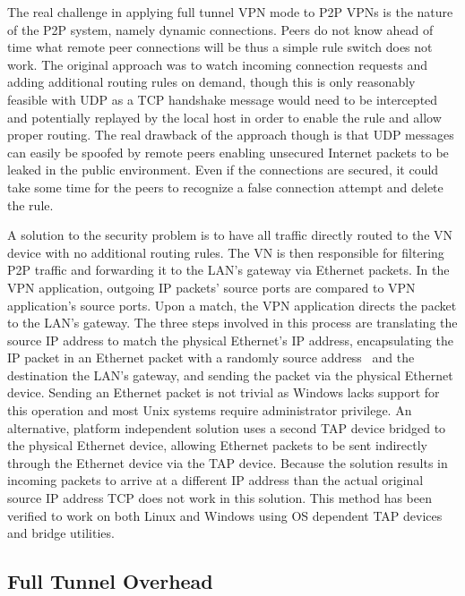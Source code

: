 The real challenge in applying full tunnel VPN mode to P2P VPNs is the nature
of the P2P system, namely dynamic connections.  Peers do not know ahead of time
what remote peer connections will be thus a simple rule switch does not work.
The original approach was to watch incoming connection requests and adding
additional routing rules on demand, though this is only reasonably feasible
with UDP as a TCP handshake message would need to be intercepted and potentially
replayed by the local host in order to enable the rule and allow proper routing.
The real drawback of the approach though is that UDP messages can easily be
spoofed by remote peers enabling unsecured Internet packets to be leaked in the
public environment.  Even if the connections are secured, it could take some
time for the peers to recognize a false connection attempt and delete the rule.

A solution to the security problem is to have all traffic directly routed to
the VN device with no additional routing rules.  The VN is then responsible for
filtering P2P traffic and forwarding it to the LAN's gateway via Ethernet
packets.  In the VPN application, outgoing IP packets' source ports are
compared to VPN application's source ports.  Upon a match, the VPN application
directs the packet to the LAN's gateway.  The three steps involved in this
process are translating the source IP address to match the physical Ethernet's
IP address, encapsulating the IP packet in an Ethernet packet with a randomly
source address~\cite{sc09} and the destination the LAN's gateway, and sending
the packet via the physical Ethernet device.  Sending an Ethernet packet is not
trivial as Windows lacks support for this operation and most Unix systems
require administrator privilege.  An alternative, platform independent solution
uses a second TAP device bridged to the physical Ethernet device, allowing
Ethernet packets to be sent indirectly through the Ethernet device via the TAP
device.  Because the solution results in incoming packets to arrive at a
different IP address than the actual original source IP address TCP does not
work in this solution.  This method has been verified to work on both Linux and
Windows using OS dependent TAP devices and bridge utilities.

\subsection{Full Tunnel Overhead}
\label{full_tunnel_eval}

